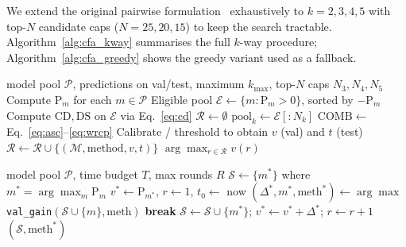 \documentclass[conference]{IEEEtran}
\begin{document}
We extend the original pairwise formulation~\cite{Lin2007} exhaustively to
$k\!=\!2,3,4,5$ with top-$N$ candidate caps ($N\!=\!25,20,15$) to keep the
search tractable. Algorithm~\ref{alg:cfa_kway} summarises the full
$k$-way procedure; Algorithm~\ref{alg:cfa_greedy} shows the greedy variant
used as a fallback.

\begin{algorithm}[t]
\caption{$k$-way exhaustive CFA}
\label{alg:cfa_kway}
\begin{algorithmic}[1]
\Require model pool $\mathcal{P}$, predictions on val/test,
         maximum $k_{\max}$, top-$N$ caps $N_3,N_4,N_5$
\State Compute $\mathrm{P}_m$ for each $m \in \mathcal{P}$
\State Eligible pool $\mathcal{E} \gets \{m : \mathrm{P}_m > 0\}$, sorted by $-\mathrm{P}_m$
\State Compute $\mathrm{CD}, \mathrm{DS}$ on $\mathcal{E}$ via Eq.~\ref{eq:cd}
\State $\mathcal{R} \gets \emptyset$
   \State $\mathrm{pool}_k \gets \mathcal{E}[:N_k]$ 
         \State $\mathrm{COMB} \gets$ Eq.~\ref{eq:asc}--\ref{eq:wrcp}
         \State Calibrate / threshold to obtain $v$ (val) and $t$ (test)
         \State $\mathcal{R} \gets \mathcal{R} \cup \{(\mathcal{M},\text{method},v,t)\}$
      \EndFor
   \EndFor
\EndFor
\State \Return $\arg\max_{r\in\mathcal{R}} v(r)$
\end{algorithmic}
\end{algorithm}

\begin{algorithm}[t]
\caption{Greedy forward CFA (fallback)}
\label{alg:cfa_greedy}
\begin{algorithmic}[1]
\Require model pool $\mathcal{P}$, time budget $T$, max rounds $R$
\State $\mathcal{S} \gets \{m^{*}\}$ where $m^{*}\!=\!\arg\max_m \mathrm{P}_m$
\State $v^{*}\gets \mathrm{P}_{m^{*}}$, $r\gets 1$, $t_{0}\gets$ now
   \State $(\Delta^*,m^{*},\text{meth}^*) \gets \arg\max$
          \texttt{val\_gain}$(\mathcal{S}\cup\{m\},\text{meth})$
   \State \textbf{break}\EndIf
   \State $\mathcal{S} \gets \mathcal{S} \cup \{m^{*}\}$;
          $v^{*} \gets v^{*}+\Delta^*$;
          $r\gets r\!+\!1$
\EndWhile
\State \Return $(\mathcal{S},\text{meth}^*)$
\end{algorithmic}
\end{algorithm}
\end{document}
